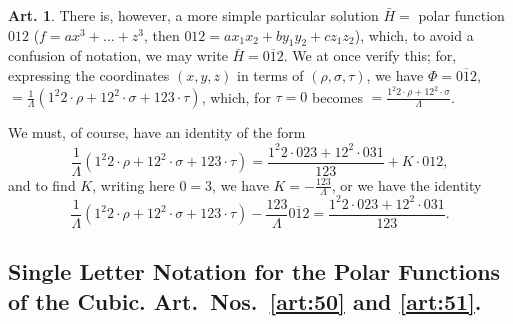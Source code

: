 \documentclass[12pt,a4paper]{article}
\theoremstyle{definition}
\newtheorem{art}{Art.}[section]
\begin{document}
\begin{art}\label{art:49}
There is, however, a more simple particular solution $\bar{H} = $ polar function $012$ ($f = ax^3 + \ldots + z^3$, then $012 = ax_1x_2 + by_1y_2 + cz_1z_2$), which, to avoid a confusion of notation, we may write $\bar{H} = \overline{012}$. We at once verify this; for, expressing the coordinates $(x, y, z)$ in terms of $(\rho, \sigma, \tau)$, we have $\Phi = \overline{012}$, $= \frac{1}{\Lambda}(1^2 2 \cdot \rho + 12^2 \cdot \sigma + 123 \cdot \tau)$, which, for $\tau = 0$ becomes $= \frac{1^2 2 \cdot \rho + 12^2 \cdot \sigma}{\Lambda}$.

We must, of course, have an identity of the form
\[
\frac{1}{\Lambda}(1^2 2 \cdot \rho + 12^2 \cdot \sigma + 123 \cdot \tau) = \frac{1^2 2 \cdot 023 + 12^2 \cdot 031}{123} + K \cdot 012,
\]
and to find $K$, writing here $0 = 3$, we have $K = -\frac{123}{\Lambda}$, or we have the identity
\[
\frac{1}{\Lambda}(1^2 2 \cdot \rho + 12^2 \cdot \sigma + 123 \cdot \tau) - \frac{123}{\Lambda}\overline{012} = \frac{1^2 2 \cdot 023 + 12^2 \cdot 031}{123}.
\]
\end{art}

\subsection*{Single Letter Notation for the Polar Functions of the Cubic. Art.~Nos.~\ref{art:50} and \ref{art:51}.}
\end{document}
